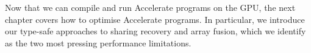 Now that we can compile and run Accelerate programs on the GPU, the next chapter
covers how to optimise Accelerate programs. In particular, we introduce our
type-safe approaches to sharing recovery and array fusion, which we identify as
the two most pressing performance limitations.


% 



%
%

